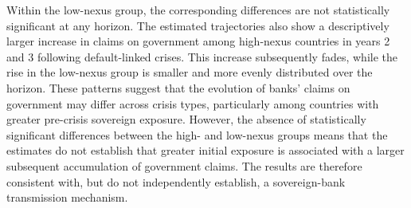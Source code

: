 \documentclass[12pt]{article}
\renewcommand{\arraystretch}{1.25}
\begin{document}
 Within the low-nexus group, the corresponding
differences are not statistically significant at any horizon. The
estimated trajectories also show a descriptively larger increase in
claims on government among high-nexus countries in years 2 and 3
following default-linked crises. This increase subsequently fades, while
the rise in the low-nexus group is smaller and more evenly distributed
over the horizon. These patterns suggest that the evolution of banks'
claims on government may differ across crisis types, particularly among
countries with greater pre-crisis sovereign exposure. However, the
absence of statistically significant differences between the high- and
low-nexus groups means that the estimates do not establish that greater
initial exposure is associated with a larger subsequent accumulation of
government claims. The results are therefore consistent with, but do not
independently establish, a sovereign-bank transmission mechanism.
\begingroup
\scriptsize
\setlength{\tabcolsep}{3pt}
\renewcommand{\arraystretch}{1.0}
\end{document}
